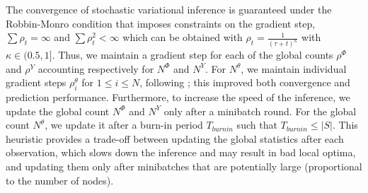 The convergence of stochastic variational inference is guaranteed under the Robbin-Monro condition \cite{robbins1951stochastic} that imposes constraints on the gradient step, $\sum \rho_t = \infty$ and $\sum \rho_t^2 < \infty$ which can be obtained with $\rho_t = \frac{1}{(\tau +t)^\kappa}$ with $\kappa \in (0.5, 1]$. Thus, we maintain a gradient step for each of the global counts $\rho^\Phi$ and $\rho^{Y}$ accounting respectively for  $N^\Phi$ and $N^{Y}$. For $N^\theta$, we maintain individual gradient steps $\rho_i^{\theta}$ for $1\leq i\leq N$, following \cite{miller2009nonparametric}; this improved both convergence and prediction performance. Furthermore, to increase the speed of the inference, we update the global count $N^\Phi$ and $N^{Y}$ only after a minibatch round. For the global count  $N^\theta$, we update it after a burn-in period $T_{burnin}$ such that $T_{burnin} \leq |S|$.
This heuristic provides a trade-off between updating the global statistics after each observation, which slows down the inference and may result in bad local optima, and updating them only after minibatches that are potentially large (proportional to the number of nodes).


%
%

